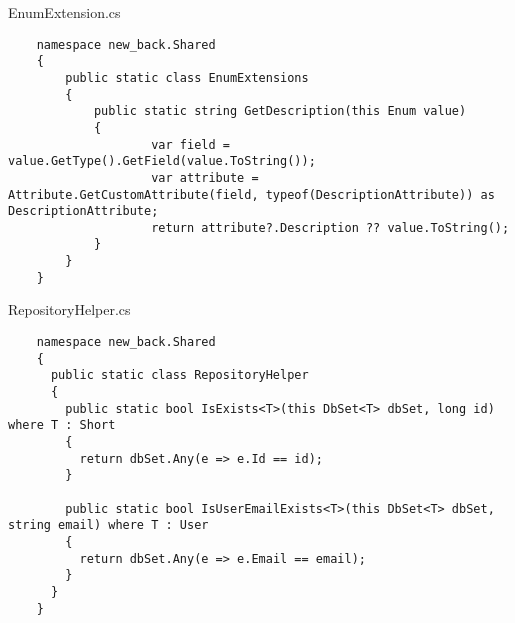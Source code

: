 EnumExtension.cs
\lstset{style=sharpc}
\begin{lstlisting}
    namespace new_back.Shared
    {
        public static class EnumExtensions
        {
            public static string GetDescription(this Enum value)
            {
                    var field = value.GetType().GetField(value.ToString());
                    var attribute = Attribute.GetCustomAttribute(field, typeof(DescriptionAttribute)) as DescriptionAttribute;
                    return attribute?.Description ?? value.ToString();
            }
        }
    }
\end{lstlisting}

RepositoryHelper.cs
\lstset{style=sharpc}
\begin{lstlisting}
    namespace new_back.Shared
    {
      public static class RepositoryHelper
      {
        public static bool IsExists<T>(this DbSet<T> dbSet, long id) where T : Short
        {
          return dbSet.Any(e => e.Id == id);
        }
        
        public static bool IsUserEmailExists<T>(this DbSet<T> dbSet, string email) where T : User
        {
          return dbSet.Any(e => e.Email == email);
        }
      }
    }
\end{lstlisting}

